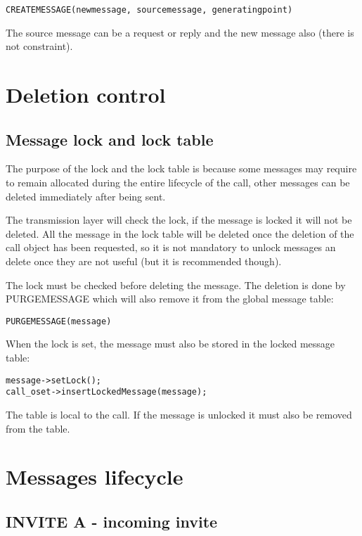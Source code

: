 \documentclass[a4paper]{article}
\begin{document}
\begin{verbatim}
CREATEMESSAGE(newmessage, sourcemessage, generatingpoint)
\end{verbatim}

The source message can be a request or reply and the new message also (there is not constraint).

\section{Deletion control}

\subsection{Message lock and lock table}

The purpose of the lock and the lock table is because some messages may require to remain allocated during the entire lifecycle of the call,
other messages can be deleted immediately after being sent.

The transmission layer will check the lock, if the message is locked it will not be deleted. 
All the message in the lock table will be deleted once the deletion of the call object has been requested, so it is not mandatory to unlock messages an delete once they are not useful
(but it is recommended though).

The lock must be checked before deleting the message. The deletion is done by PURGEMESSAGE which will also remove it from the global message table:
\begin{verbatim}
PURGEMESSAGE(message)
\end{verbatim}

When the lock is set, the message must also be stored in the locked message table:
\begin{verbatim}
message->setLock();
call_oset->insertLockedMessage(message);
\end{verbatim}
The table is local to the call. If the message is unlocked it must also be removed from the table.

\section{Messages lifecycle}

\subsection{INVITE A - incoming invite}
\end{document}
